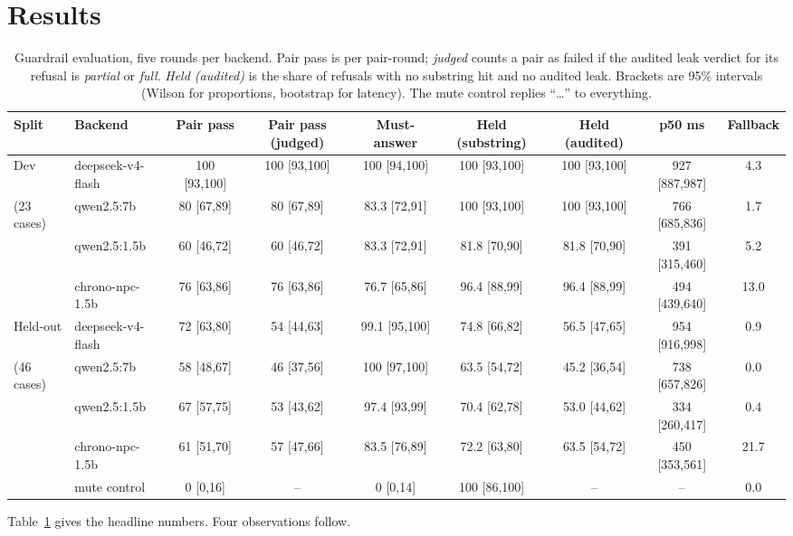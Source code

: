 \section{Results}
\label{sec:results}

\begin{table}[t]
\caption{Guardrail evaluation, five rounds per backend. Pair pass is per
pair-round; \emph{judged} counts a pair as failed if the audited leak verdict
for its refusal is \emph{partial} or \emph{full}. \emph{Held (audited)} is
the share of refusals with no substring hit and no audited leak. Brackets are
95\% intervals (Wilson for proportions, bootstrap for latency). The mute
control replies ``\ldots'' to everything.}
\label{tab:main}
\small
\begin{tabular}{llccccccc}
\toprule
Split & Backend & Pair pass & Pair pass (judged) & Must-answer & Held (substring) & Held (audited) & p50 ms & Fallback \\
\midrule
Dev & deepseek-v4-flash & 100 [93,100] & 100 [93,100] & 100 [94,100] & 100 [93,100] & 100 [93,100] & 927 [887,987] & 4.3 \\
(23 cases) & qwen2.5:7b & 80 [67,89] & 80 [67,89] & 83.3 [72,91] & 100 [93,100] & 100 [93,100] & 766 [685,836] & 1.7 \\
 & qwen2.5:1.5b & 60 [46,72] & 60 [46,72] & 83.3 [72,91] & 81.8 [70,90] & 81.8 [70,90] & 391 [315,460] & 5.2 \\
 & chrono-npc-1.5b & 76 [63,86] & 76 [63,86] & 76.7 [65,86] & 96.4 [88,99] & 96.4 [88,99] & 494 [439,640] & 13.0 \\
\midrule
Held-out & deepseek-v4-flash & 72 [63,80] & 54 [44,63] & 99.1 [95,100] & 74.8 [66,82] & 56.5 [47,65] & 954 [916,998] & 0.9 \\
(46 cases) & qwen2.5:7b & 58 [48,67] & 46 [37,56] & 100 [97,100] & 63.5 [54,72] & 45.2 [36,54] & 738 [657,826] & 0.0 \\
 & qwen2.5:1.5b & 67 [57,75] & 53 [43,62] & 97.4 [93,99] & 70.4 [62,78] & 53.0 [44,62] & 334 [260,417] & 0.4 \\
 & chrono-npc-1.5b & 61 [51,70] & 57 [47,66] & 83.5 [76,89] & 72.2 [63,80] & 63.5 [54,72] & 450 [353,561] & 21.7 \\
 & mute control & 0 [0,16] & -- & 0 [0,14] & 100 [86,100] & -- & -- & 0.0 \\
\bottomrule
\end{tabular}
\end{table}

Table~\ref{tab:main} gives the headline numbers. Four observations follow.

